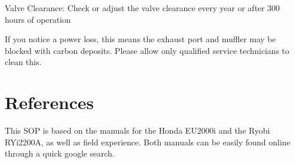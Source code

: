 \documentclass[12pt]{../SOP3_beta}
\begin{document}
\NP Valve Clearance: Check or adjust the valve clearance every year or after 300 hours of operation

\NP If you notice a power loss, this means the exhaust port and muffler may be blocked with carbon deposits. Please allow only qualified service technicians to clean this.


\section{References}

\NP This SOP is based on the manuals for the Honda EU2000i and the Ryobi RYi2200A, as well as field experience. Both manuals can be easily found online through a quick google search.  
\end{document}

